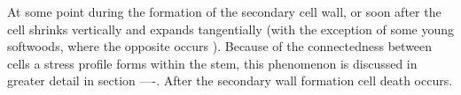 At some point during the formation of the secondary cell wall, or soon after the
cell shrinks vertically and expands tangentially \cite{Boyd_1972} (with the exception of
some young softwoods, where the opposite occurs \cite{jacobs1945l}). Because of the connectedness
between cells a stress profile forms within the stem, this phenomenon is discussed
in greater detail in section ----. After the secondary wall formation cell death
occurs.